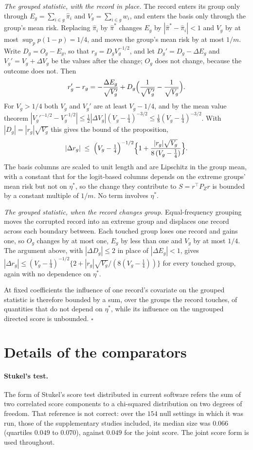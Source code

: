 \documentclass[11pt]{article}
\providecommand{\qed}{\ensuremath{\square}}
\begin{document}
\emph{The grouped statistic, with the record in place.} The record enters its group only through
$E_g=\sum_{i\in g}\hat\pi_i$ and $V_g=\sum_{i\in g}w_i$, and enters the basis only through the
group's mean risk. Replacing $\hat\pi_i$ by $\hat\pi^{*}$ changes $E_g$ by $|\hat\pi^{*}-\hat\pi_i|<1$
and $V_g$ by at most $\sup_p p(1-p)=1/4$, and moves the group's mean risk by at most $1/m$. Write
$D_g=O_g-E_g$, so that $r_g=D_gV_g^{-1/2}$, and let $D_g'=D_g-\Delta E_g$ and $V_g'=V_g+\Delta V_g$ be
the values after the change; $O_g$ does not change, because the outcome does not. Then
\[
  r_g'-r_g=-\frac{\Delta E_g}{\sqrt{V_g'}}+D_g\Bigl(\frac1{\sqrt{V_g'}}-\frac1{\sqrt{V_g}}\Bigr).
\]
For $V_g>1/4$ both $V_g$ and $V_g'$ are at least $V_g-1/4$, and by the mean value theorem
$|V_g'^{-1/2}-V_g^{-1/2}|\le\tfrac12|\Delta V_g|(V_g-\tfrac14)^{-3/2}\le\tfrac18(V_g-\tfrac14)^{-3/2}$.
With $|D_g|=|r_g|\sqrt{V_g}$ this gives the bound of the proposition,
\[
  |\Delta r_g|\;\le\;\Bigl(V_g-\tfrac14\Bigr)^{-1/2}
  \Bigl\{1+\frac{|r_g|\sqrt{V_g}}{8\,(V_g-\frac14)}\Bigr\}.
\]
The basis columns are scaled to unit length and are Lipschitz in the group mean, with a constant that
for the logit-based columns depends on the extreme groups' mean risk but not on $\eta^{*}$, so the change they
contribute to $S=r^\top P_Z r$ is bounded by a constant multiple of $1/m$. No term involves
$\eta^{*}$.

\emph{The grouped statistic, when the record changes group.} Equal-frequency grouping moves the
corrupted record into an extreme group and displaces one record across each boundary between. Each
touched group loses one record and gains one, so $O_g$ changes by at most one, $E_g$ by less than one
and $V_g$ by at most $1/4$. The argument above, with $|\Delta D_g|\le2$ in place of $|\Delta E_g|<1$,
gives $|\Delta r_g|\le(V_g-\frac14)^{-1/2}\{2+|r_g|\sqrt{V_g}/(8(V_g-\frac14))\}$ for every touched
group, again with no dependence on $\eta^{*}$.

At fixed coefficients the influence of one record's covariate on the grouped statistic is therefore
bounded by a sum, over the groups the record touches, of quantities that do not depend on $\eta^{*}$,
while its influence on the ungrouped directed score is unbounded. \qed

\section{Details of the comparators}\label{si:comparators}

\paragraph{Stukel's test.} The form of Stukel's score test distributed in current software
\citep{LogisticDx} refers the sum of two correlated score components to a chi-squared distribution on
two degrees of freedom. That reference is not correct: over the $154$ null settings in which it was
run, those of the supplementary studies included, its median size was $0.066$ (quartiles $0.049$ to
$0.070$), against $0.049$ for the joint score. The joint score form is used throughout.
\end{document}
